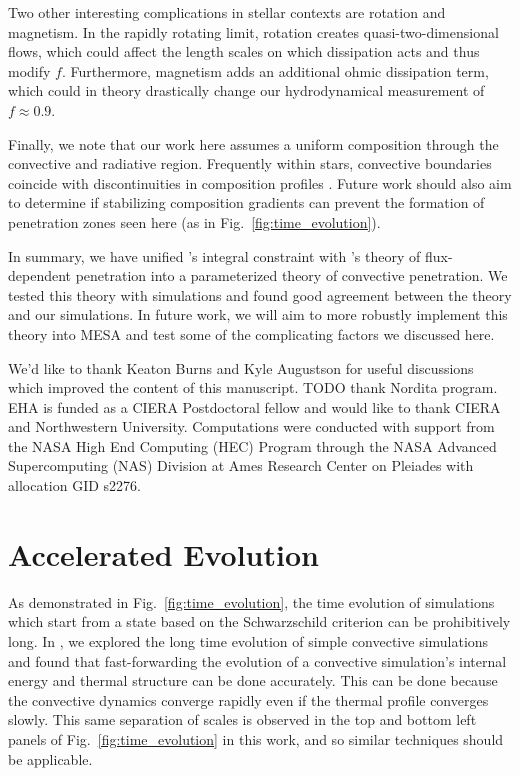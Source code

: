 \documentclass{aastex631}
\begin{document}
Two other interesting complications in stellar contexts are rotation and magnetism.
In the rapidly rotating limit, rotation creates quasi-two-dimensional flows, which could affect the length scales on which dissipation acts and thus modify $f$.
Furthermore, magnetism adds an additional ohmic dissipation term, which could in theory drastically change our hydrodynamical measurement of $f \approx 0.9$.

Finally, we note that our work here assumes a uniform composition through the convective and radiative region.
Frequently within stars, convective boundaries coincide with discontinuities in composition profiles \citep{salaris_cassisi_2017}.
Future work should also aim to determine if stabilizing composition gradients can prevent the formation of penetration zones seen here (as in Fig.~\ref{fig:time_evolution}).

In summary, we have unified \citet{roxburgh1989}'s integral constraint with \citet{zahn1991}'s theory of flux-dependent penetration into a parameterized theory of convective penetration.
We tested this theory with simulations and found good agreement between the theory and our simulations.
In future work, we will aim to more robustly implement this theory into MESA and test some of the complicating factors we discussed here.





\begin{acknowledgments}
We'd like to thank Keaton Burns and Kyle Augustson for useful discussions which improved the content of this manuscript.
TODO thank Nordita program.
EHA is funded as a CIERA Postdoctoral fellow and would like to thank CIERA and Northwestern University. 
Computations were conducted with support from the NASA High End Computing (HEC) Program through the NASA Advanced Supercomputing (NAS) Division at Ames Research Center on Pleiades with allocation GID s2276.
\end{acknowledgments}


\appendix

\section{Accelerated Evolution}
\label{app:accelerated_evolution}
As demonstrated in Fig.~\ref{fig:time_evolution}, the time evolution of simulations which start from a state based on the Schwarzschild criterion can be prohibitively long.
In \citet{anders_etal_2018}, we explored the long time evolution of simple convective simulations and found that fast-forwarding the evolution of a convective simulation's internal energy and thermal structure can be done accurately.
This can be done because the convective dynamics converge rapidly even if the thermal profile converges slowly.
This same separation of scales is observed in the top and bottom left panels of Fig.~\ref{fig:time_evolution} in this work, and so similar techniques should be applicable.
\end{document}
